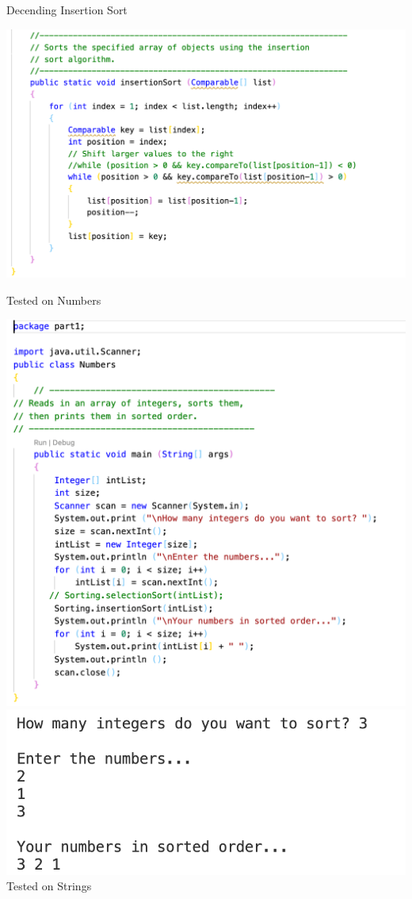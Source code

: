 \documentclass[hidelinks,12pt]{article}
\begin{document}
Decending Insertion Sort

\includegraphics[scale=0.4]{desInsert.png} 

Tested on Numbers

\includegraphics[scale=0.4]{newNum.png}
\includegraphics[scale=0.55]{newNumR.png}
\newpage
Tested on Strings
\end{document}
